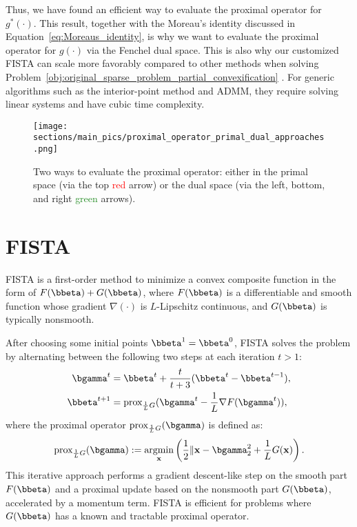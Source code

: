 Thus, we have found an efficient way to evaluate the proximal operator for $g^*(\cdot)$.
This result, together with the Moreau's identity discussed in Equation~\eqref{eq:Moreaus_identity}, is why we want to evaluate the proximal operator for $g(\cdot)$ via the Fenchel dual space.
This is also why our customized FISTA can scale more favorably compared to other methods when solving Problem~\eqref{obj:original_sparse_problem_partial_convexification} .
For generic algorithms such as the interior-point method and ADMM, they require solving linear systems and have cubic time complexity.










\begin{figure}[h]
    \texttt{[image: sections/main\_pics/proximal\_operator\_primal\_dual\_approaches.png]}
    \caption{Two ways to evaluate the proximal operator: either in the primal space (via the top \textcolor{red}{red} arrow) or the dual space (via the left, bottom, and right \textcolor{ForestGreen}{green} arrows).}
    \label{pic:proximal_operator_primal_dual_approaches}
\end{figure}

\section{FISTA}
\label{sec:preliminary_subsec:fista}



FISTA is a first-order method to minimize a convex composite function in the form of $F(\bbeta) + G(\bbeta)$, where $F(\bbeta)$ is a differentiable and smooth function whose gradient $\nabla(\cdot)$ is $L$-Lipschitz continuous, and $G(\bbeta)$ is typically nonsmooth.

After choosing some initial points $\bbeta^1=\bbeta^0$, FISTA solves the problem by alternating between the following two steps at each iteration $t>1$:
\begin{align*}
        \bgamma^t &= \bbeta^t + \frac{t}{t+3} (\bbeta^t - \bbeta^{t-1}), \\
        \bbeta^{t+1} &= \text{prox}_{\frac{1}{L}G}(\bgamma^t - \frac{1}{L} \nabla F(\bgamma^t)),
\end{align*}
where the proximal operator $\text{prox}_{\frac{1}{L}G}(\bgamma)$ is defined as:
\begin{align*}
\text{prox}_{\frac{1}{L}G}(\bgamma) := \underset{\mathbf{x}}{\text{argmin}} \left( \frac{1}{2} \Vert{\mathbf{x} - \bgamma }_2^2 + \frac{1}{L}G(\mathbf{x}) \right).
\end{align*}
This iterative approach performs a gradient descent-like step on the smooth part $F(\bbeta)$ and a proximal update based on the nonsmooth part $G(\bbeta)$, accelerated by a momentum term.
FISTA is efficient for problems where $G(\bbeta)$ has a known and tractable proximal operator.


